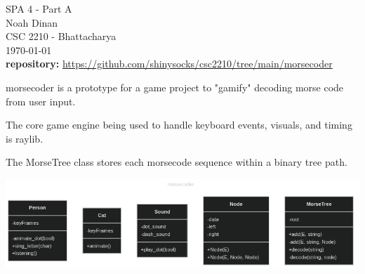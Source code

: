 \documentclass[12pt]{article}
\begin{document}
\setlength{\parindent}{0in}
SPA 4 - Part A \\ Noah Dinan \\ CSC 2210 - Bhattacharya \\ \today \\
\textbf{repository:} \url{https://github.com/shinysocks/csc2210/tree/main/morsecoder}

\vspace{0.2in}


morsecoder is a prototype for a game project to "gamify" decoding morse code from user input.

The core game engine being used to handle keyboard events, visuals, and timing is raylib.

The MorseTree class stores each morsecode sequence within a binary tree path.

\begin{center}
    \includegraphics[scale=0.6]{o-1.png}
\end{center}
\end{document}
